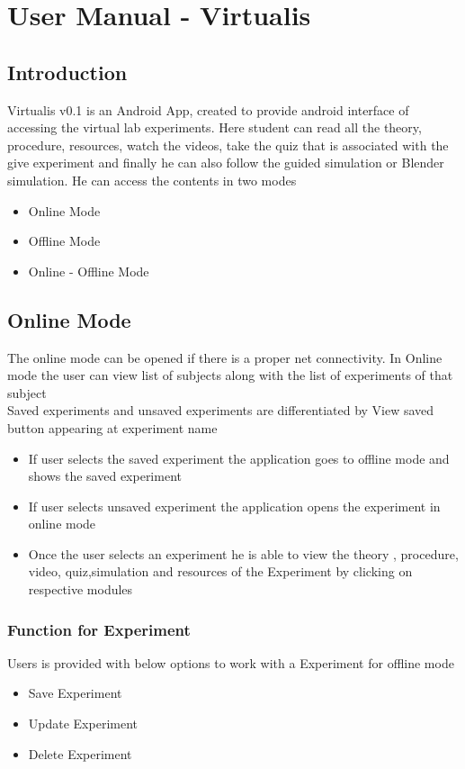\documentclass[12pt]{report}
\begin{document}
\chapter{User Manual - Virtualis}


\section{Introduction}
Virtualis v0.1 is an Android App, created to provide android interface of accessing the virtual lab experiments. Here student can read all the theory, procedure, resources, watch the videos, take the quiz that is associated with the give experiment and finally he can also follow the guided simulation or Blender simulation. He can access the contents in two modes 

\begin{itemize}
\item Online Mode
\item Offline Mode
\item Online - Offline Mode
\end{itemize}

\section{Online Mode}
The online mode can be opened if there is a proper net connectivity. In Online mode the user can view list of subjects along with the list of experiments of that subject\\
Saved experiments and unsaved experiments are differentiated by View saved button appearing at experiment name

\begin{itemize}

\item If user selects the saved experiment the application goes to offline mode and shows the saved experiment

\item If user selects unsaved experiment the application opens the experiment in online mode

\item Once the user selects an experiment he is able to view the theory , procedure, video, quiz,simulation and resources of the Experiment by clicking on respective modules

\end{itemize}
\pagebreak

\subsection{Function for Experiment}
Users is provided with below options to work with a Experiment for offline mode
\begin{itemize}
\item Save Experiment
\item Update Experiment
\item Delete Experiment
\end{itemize}
\end{document}
